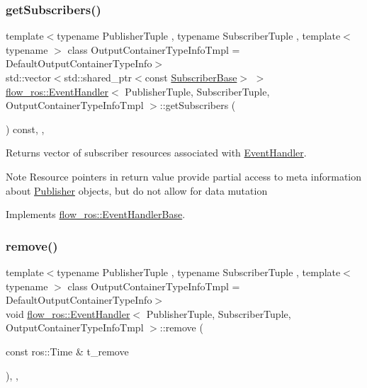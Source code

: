 \subsubsection{\texorpdfstring{get\+Subscribers()}{getSubscribers()}}
{\footnotesize\ttfamily template$<$typename Publisher\+Tuple , typename Subscriber\+Tuple , template$<$ typename $>$ class Output\+Container\+Type\+Info\+Tmpl = Default\+Output\+Container\+Type\+Info$>$ \\
std\+::vector$<$std\+::shared\+\_\+ptr$<$const \hyperlink{classflow__ros_1_1_subscriber_base}{Subscriber\+Base}$>$ $>$ \hyperlink{classflow__ros_1_1_event_handler}{flow\+\_\+ros\+::\+Event\+Handler}$<$ Publisher\+Tuple, Subscriber\+Tuple, Output\+Container\+Type\+Info\+Tmpl $>$\+::get\+Subscribers (\begin{DoxyParamCaption}{ }\end{DoxyParamCaption}) const\hspace{0.3cm}{\ttfamily [inline]}, {\ttfamily [override]}, {\ttfamily [virtual]}}



Returns vector of subscriber resources associated with \hyperlink{classflow__ros_1_1_event_handler}{Event\+Handler}. 

\begin{DoxyNote}{Note}
Resource pointers in return value provide partial access to meta information about \hyperlink{classflow__ros_1_1_publisher}{Publisher} objects, but do not allow for data mutation 
\end{DoxyNote}


Implements \hyperlink{classflow__ros_1_1_event_handler_base_a5c6b2e230dcb308eff3f0aea18c47be3}{flow\+\_\+ros\+::\+Event\+Handler\+Base}.

\mbox{\label{classflow__ros_1_1_event_handler_aeaf45592fd8c7fe8c3a4b0da23496d69}} 
\subsubsection{\texorpdfstring{remove()}{remove()}}
{\footnotesize\ttfamily template$<$typename Publisher\+Tuple , typename Subscriber\+Tuple , template$<$ typename $>$ class Output\+Container\+Type\+Info\+Tmpl = Default\+Output\+Container\+Type\+Info$>$ \\
void \hyperlink{classflow__ros_1_1_event_handler}{flow\+\_\+ros\+::\+Event\+Handler}$<$ Publisher\+Tuple, Subscriber\+Tuple, Output\+Container\+Type\+Info\+Tmpl $>$\+::remove (\begin{DoxyParamCaption}\item[{const ros\+::\+Time \&}]{t\+\_\+remove }\end{DoxyParamCaption})\hspace{0.3cm}{\ttfamily [inline]}, {\ttfamily [override]}, {\ttfamily [virtual]}}



